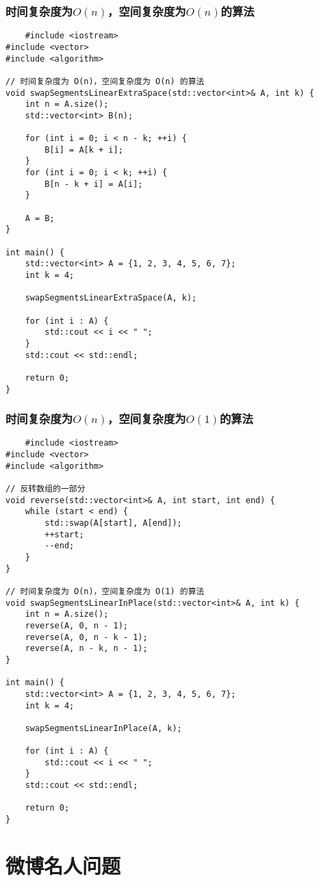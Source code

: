 \documentclass{article}
\begin{document}
\subsubsection{时间复杂度为$O(n)$，空间复杂度为$O(n)$的算法}
\begin{lstlisting}
    #include <iostream>
#include <vector>
#include <algorithm>

// 时间复杂度为 O(n)，空间复杂度为 O(n) 的算法
void swapSegmentsLinearExtraSpace(std::vector<int>& A, int k) {
    int n = A.size();
    std::vector<int> B(n);

    for (int i = 0; i < n - k; ++i) {
        B[i] = A[k + i];
    }
    for (int i = 0; i < k; ++i) {
        B[n - k + i] = A[i];
    }

    A = B;
}

int main() {
    std::vector<int> A = {1, 2, 3, 4, 5, 6, 7};
    int k = 4;

    swapSegmentsLinearExtraSpace(A, k);

    for (int i : A) {
        std::cout << i << " ";
    }
    std::cout << std::endl;

    return 0;
}
\end{lstlisting}
\subsubsection{时间复杂度为$O(n)$，空间复杂度为$O(1)$的算法}
\begin{lstlisting}
    #include <iostream>
#include <vector>
#include <algorithm>

// 反转数组的一部分
void reverse(std::vector<int>& A, int start, int end) {
    while (start < end) {
        std::swap(A[start], A[end]);
        ++start;
        --end;
    }
}

// 时间复杂度为 O(n)，空间复杂度为 O(1) 的算法
void swapSegmentsLinearInPlace(std::vector<int>& A, int k) {
    int n = A.size();
    reverse(A, 0, n - 1);
    reverse(A, 0, n - k - 1);
    reverse(A, n - k, n - 1);
}

int main() {
    std::vector<int> A = {1, 2, 3, 4, 5, 6, 7};
    int k = 4;

    swapSegmentsLinearInPlace(A, k);

    for (int i : A) {
        std::cout << i << " ";
    }
    std::cout << std::endl;

    return 0;
}
\end{lstlisting}

\section{微博名人问题}
\end{document}

